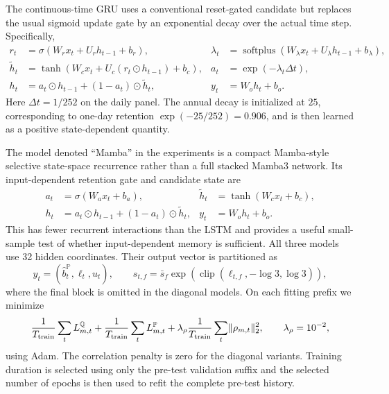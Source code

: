 \documentclass[11pt]{article}
\newcommand{\Q}{\mathbb Q}
\newcommand{\PP}{\mathbb P}
\theoremstyle{plain}
\theoremstyle{definition}
\theoremstyle{remark}
\begin{document}
The continuous-time GRU uses a conventional reset-gated candidate but replaces
the usual sigmoid update gate by an exponential decay over the actual time
step.  Specifically,
\begin{align}
  r_t&=\sigma(W_rx_t+U_rh_{t-1}+b_r),
  &\lambda_t&=\operatorname{softplus}
    (W_\lambda x_t+U_\lambda h_{t-1}+b_\lambda), \\
  \widetilde h_t&=\tanh\!\left(
    W_cx_t+U_c(r_t\odot h_{t-1})+b_c
  \right),
  &a_t&=\exp(-\lambda_t\Delta t), \\
  h_t&=a_t\odot h_{t-1}+(1-a_t)\odot\widetilde h_t,
  &y_t&=W_oh_t+b_o.
  \label{eq:continuous-time-gru-factor-law}
\end{align}
Here $\Delta t=1/252$ on the daily panel.  The annual decay is initialized at
$25$, corresponding to one-day retention $\exp(-25/252)=0.906$, and is then
learned as a positive state-dependent quantity.

The model denoted ``Mamba'' in the experiments is a compact Mamba-style
selective state-space recurrence rather than a full stacked Mamba3 network.
Its input-dependent retention gate and candidate state are
\begin{align}
  a_t&=\sigma(W_ax_t+b_a),
  &\widetilde h_t&=\tanh(W_cx_t+b_c), \\
  h_t&=a_t\odot h_{t-1}+(1-a_t)\odot\widetilde h_t,
  &y_t&=W_oh_t+b_o.
  \label{eq:selective-ssm-factor-law}
\end{align}
This has fewer recurrent interactions than the LSTM and provides a useful
small-sample test of whether input-dependent memory is sufficient.  All three
models use 32 hidden coordinates.  Their output vector is partitioned as
\begin{equation}
  y_t=
  \left(
    \widehat b_t^\PP,
    \ell_t,
    u_t
  \right),
  \qquad
  s_{t,f}=\bar s_f\exp\!\left(
    \operatorname{clip}(\ell_{t,f},-\log3,\log3)
  \right),
  \label{eq:recurrent-factor-law-output}
\end{equation}
where the final block is omitted in the diagonal models.  On each fitting
prefix we minimize
\begin{equation}
  \frac1{T_{\rm train}}\sum_t L^\Q_{m,t}
  +\frac1{T_{\rm train}}\sum_t L^\PP_{m,t}
  +\lambda_\rho\frac1{T_{\rm train}}\sum_t
    \lVert\rho_{m,t}\rVert_2^2,
  \qquad \lambda_\rho=10^{-2},
  \label{eq:joint-factor-law-training-objective}
\end{equation}
using Adam.  The correlation penalty is zero for the diagonal variants.
Training duration is selected using only the pre-test validation suffix and
the selected number of epochs is then used to refit the complete pre-test
history.
\end{document}
